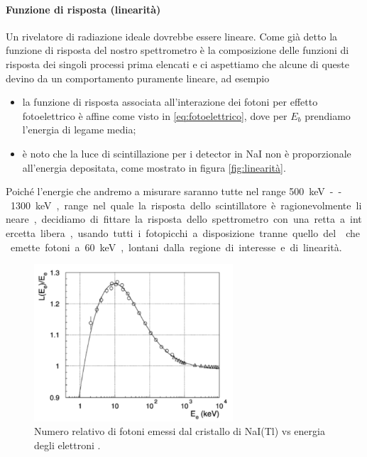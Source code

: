  \paragraph{Funzione di risposta (linearità)}
 Un rivelatore di radiazione ideale dovrebbe essere lineare. Come già detto la funzione di risposta del nostro spettrometro è la composizione delle funzioni di risposta dei singoli processi prima elencati e ci aspettiamo che alcune di queste devino da un comportamento puramente lineare, ad esempio
 \begin{itemize}
 	\item la funzione di risposta associata all'interazione dei fotoni per effetto fotoelettrico è affine come visto in \autoref{eq:fotoelettrico}, dove per $E_b$ prendiamo l'energia di legame media;
 	\item è noto che la luce di scintillazione per i detector in NaI non è proporzionale all'energia depositata, come mostrato in figura \autoref{fig:linearità}.
 \end{itemize}
 Poiché l'energie che andremo a misurare saranno tutte nel range \SI{500}keV--\SI{1300}{keV}, range nel quale la risposta dello scintillatore è ragionevolmente lineare, decidiamo di fittare la risposta dello spettrometro con una retta a intercetta libera, usando tutti i fotopicchi a disposizione tranne quello del \am{} che emette fotoni a \SI{60}keV, lontani dalla regione di interesse e di linearità.
 
 \begin{figure}[h]
	\centering
	\includegraphics[width=20em]{linearita}
	\caption{\label{fig:linearità}Numero relativo di fotoni emessi dal cristallo di NaI(Tl) vs energia degli elettroni \cite{6}.}
 \end{figure}
 
